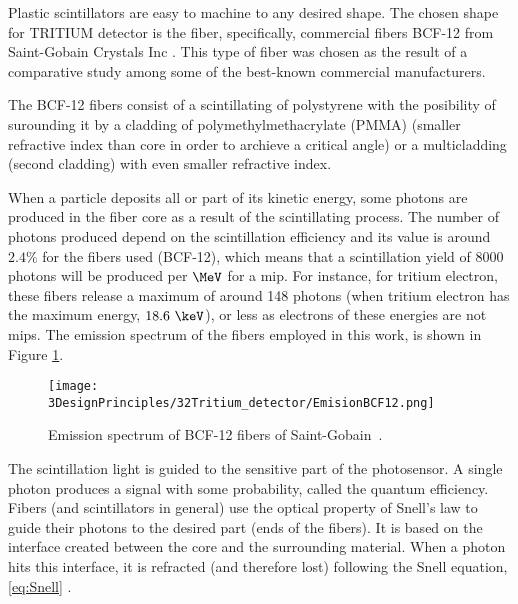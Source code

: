 Plastic scintillators are easy to machine to any desired shape. The chosen shape for TRITIUM detector is the fiber, specifically, commercial fibers BCF-12 from Saint-Gobain Crystals Inc \cite{DataSheetBCF12Fiber}. This type of fiber was chosen as the result of a comparative study \cite{TFGAlberto} among some of the best-known commercial manufacturers. 


The BCF-12 fibers consist of a scintillating of polystyrene with the posibility of surounding it by a cladding of polymethylmethacrylate (PMMA) (smaller refractive index than core in order to archieve a critical angle) or a multicladding (second cladding) with even smaller refractive index.

When a particle deposits all or part of its kinetic energy, some photons are produced in the fiber core as a result of the scintillating process. The number of photons produced depend on the scintillation efficiency and its value is around $2.4\%$ for the fibers used (BCF-12), which means that a scintillation yield of $8000$ photons will be produced per $\MeV$ for a mip. For instance, for tritium electron, these fibers release a maximum of around 148 photons (when tritium electron has the maximum energy, $18.6~\keV$), or less as electrons of these energies are not mips. The emission spectrum of the fibers employed in this work, is shown in Figure \ref{fig:EmissionSpectrumFibers}.

\begin{figure}[htbp]
\centering
\texttt{[image: 3DesignPrinciples/32Tritium\_detector/EmisionBCF12.png]}
\caption{Emission spectrum of BCF-12 fibers of Saint-Gobain\label{fig:EmissionSpectrumFibers}~\cite{DataSheetBCF12Fiber}.}
\end{figure}

The scintillation light is guided to the sensitive part of the photosensor. A single photon produces a signal with some probability, called the quantum efficiency. Fibers (and scintillators in general) use the optical property of Snell's law \cite{Snell} to guide their photons to the desired part (ends of the fibers). It is based on the interface created between the core and the surrounding material. When a photon hits this interface, it is refracted (and therefore lost) following the Snell equation, \ref{eq:Snell} \cite{Snell}. 


